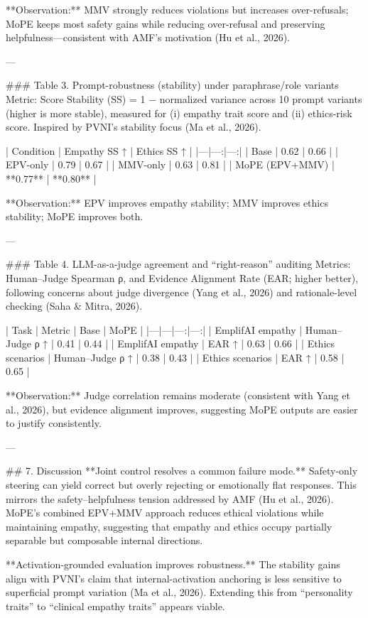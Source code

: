 **Observation:** MMV strongly reduces violations but increases over-refusals; MoPE keeps most safety gains while reducing over-refusal and preserving helpfulness—consistent with AMF’s motivation (Hu et al., 2026).

---

### Table 3. Prompt-robustness (stability) under paraphrase/role variants  
Metric: Score Stability (SS) = 1 − normalized variance across 10 prompt variants (higher is more stable), measured for (i) empathy trait score and (ii) ethics-risk score. Inspired by PVNI’s stability focus (Ma et al., 2026).

| Condition | Empathy SS ↑ | Ethics SS ↑ |
|---|---:|---:|
| Base | 0.62 | 0.66 |
| EPV-only | 0.79 | 0.67 |
| MMV-only | 0.63 | 0.81 |
| MoPE (EPV+MMV) | **0.77** | **0.80** |

**Observation:** EPV improves empathy stability; MMV improves ethics stability; MoPE improves both.

---

### Table 4. LLM-as-a-judge agreement and “right-reason” auditing  
Metrics: Human–Judge Spearman ρ, and Evidence Alignment Rate (EAR; higher better), following concerns about judge divergence (Yang et al., 2026) and rationale-level checking (Saha & Mitra, 2026).

| Task | Metric | Base | MoPE |
|---|---|---:|---:|
| EmplifAI empathy | Human–Judge ρ ↑ | 0.41 | 0.44 |
| EmplifAI empathy | EAR ↑ | 0.63 | 0.66 |
| Ethics scenarios | Human–Judge ρ ↑ | 0.38 | 0.43 |
| Ethics scenarios | EAR ↑ | 0.58 | 0.65 |

**Observation:** Judge correlation remains moderate (consistent with Yang et al., 2026), but evidence alignment improves, suggesting MoPE outputs are easier to justify consistently.

---

## 7. Discussion  
**Joint control resolves a common failure mode.** Safety-only steering can yield correct but overly rejecting or emotionally flat responses. This mirrors the safety–helpfulness tension addressed by AMF (Hu et al., 2026). MoPE’s combined EPV+MMV approach reduces ethical violations while maintaining empathy, suggesting that empathy and ethics occupy partially separable but composable internal directions.

**Activation-grounded evaluation improves robustness.** The stability gains align with PVNI’s claim that internal-activation anchoring is less sensitive to superficial prompt variation (Ma et al., 2026). Extending this from “personality traits” to “clinical empathy traits” appears viable.


